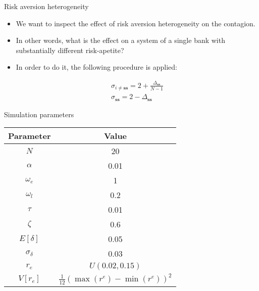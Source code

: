 \documentclass{beamer}
\begin{document}
\begin{frame}{Risk aversion heterogeneity}
    
    \begin{itemize}
        \item We want to inspect the effect of risk aversion heterogeneity on the contagion. 
        \item In other words, what is the effect on a system of a single bank with substantially different risk-apetite? 
        \item In order to do it, the following procedure is applied:
        
        \begin{equation}
            \begin{aligned}
              \sigma_{i \neq \textbf{ss}} = 2 + \frac{\Delta_{\textbf{ss}}}{N-1} \\ 
              \sigma_{\textbf{ss}} = 2 - \Delta_{\textbf{ss}}
            \end{aligned}
          \end{equation}

    \end{itemize}

\end{frame}

\begin{frame}{Simulation parameters}

    \begin{center}
        \begin{tabular}{|c c|} 
         \hline
         Parameter & Value\\ [0.5ex] 
         \hline\hline
         $N$ & 20 \\ 
         \hline
         $\alpha$ & 0.01 \\
         \hline
         $\omega_e$ & 1 \\
         \hline
         $\omega_l$ & 0.2\\
         \hline
         $\tau$ & 0.01 \\ 
         \hline
         $\zeta$ & 0.6 \\ 
         \hline
         $E[\delta]$ & 0.05 \\
         \hline
         $\sigma_\delta$ & 0.03 \\ 
         \hline
         $r_e$ & $U(0.02, 0.15)$ \\ 
         \hline
         $V[r_e]$ & $\frac{1}{12}(\max(r^e) - \min(r^e))^2$ \\  [1ex] 
         \hline
        \end{tabular}
      \end{center}
    
\end{frame}
\end{document}
